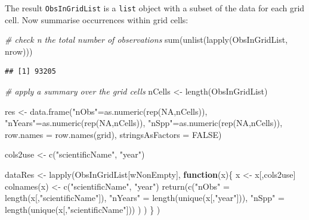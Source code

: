 \documentclass[
  10pt,
]{article}
\newenvironment{Shaded}{\begin{snugshade}}{\end{snugshade}}
\newcommand{\AttributeTok}[1]{\textcolor[rgb]{0.77,0.63,0.00}{#1}}
\newcommand{\CommentTok}[1]{\textcolor[rgb]{0.56,0.35,0.01}{\textit{#1}}}
\newcommand{\ConstantTok}[1]{\textcolor[rgb]{0.00,0.00,0.00}{#1}}
\newcommand{\ControlFlowTok}[1]{\textcolor[rgb]{0.13,0.29,0.53}{\textbf{#1}}}
\newcommand{\FunctionTok}[1]{\textcolor[rgb]{0.00,0.00,0.00}{#1}}
\newcommand{\NormalTok}[1]{#1}
\newcommand{\OtherTok}[1]{\textcolor[rgb]{0.56,0.35,0.01}{#1}}
\newcommand{\StringTok}[1]{\textcolor[rgb]{0.31,0.60,0.02}{#1}}
\begin{document}
The result \texttt{ObsInGridList} is a \texttt{list} object with a subset of the data for each grid cell. Now summarise occurrences within grid cells:

\begin{Shaded}
\begin{Highlighting}[]
\CommentTok{\# check n the total number of observations}
\FunctionTok{sum}\NormalTok{(}\FunctionTok{unlist}\NormalTok{(}\FunctionTok{lapply}\NormalTok{(ObsInGridList, nrow)))}
\end{Highlighting}
\end{Shaded}

\begin{verbatim}
## [1] 93205
\end{verbatim}

\begin{Shaded}
\begin{Highlighting}[]
\CommentTok{\# apply a summary over the grid cells }
\NormalTok{nCells }\OtherTok{\textless{}{-}} \FunctionTok{length}\NormalTok{(ObsInGridList)}

\NormalTok{res }\OtherTok{\textless{}{-}} \FunctionTok{data.frame}\NormalTok{(}\StringTok{"nObs"}\OtherTok{=}\FunctionTok{as.numeric}\NormalTok{(}\FunctionTok{rep}\NormalTok{(}\ConstantTok{NA}\NormalTok{,nCells)),}
                  \StringTok{"nYears"}\OtherTok{=}\FunctionTok{as.numeric}\NormalTok{(}\FunctionTok{rep}\NormalTok{(}\ConstantTok{NA}\NormalTok{,nCells)),}
                  \StringTok{"nSpp"}\OtherTok{=}\FunctionTok{as.numeric}\NormalTok{(}\FunctionTok{rep}\NormalTok{(}\ConstantTok{NA}\NormalTok{,nCells)),}
                  \AttributeTok{row.names =} \FunctionTok{row.names}\NormalTok{(grid),}
                  \AttributeTok{stringsAsFactors =} \ConstantTok{FALSE}\NormalTok{)}

\NormalTok{cols2use }\OtherTok{\textless{}{-}} \FunctionTok{c}\NormalTok{(}\StringTok{"scientificName"}\NormalTok{, }\StringTok{"year"}\NormalTok{)}

\NormalTok{dataRes }\OtherTok{\textless{}{-}} \FunctionTok{lapply}\NormalTok{(ObsInGridList[wNonEmpty], }
                  \ControlFlowTok{function}\NormalTok{(x)\{}
\NormalTok{                    x }\OtherTok{\textless{}{-}}\NormalTok{ x[,cols2use]}
                    \FunctionTok{colnames}\NormalTok{(x) }\OtherTok{\textless{}{-}} \FunctionTok{c}\NormalTok{(}\StringTok{"scientificName"}\NormalTok{, }\StringTok{"year"}\NormalTok{)}
                    \FunctionTok{return}\NormalTok{(}\FunctionTok{c}\NormalTok{(}\StringTok{"nObs"} \OtherTok{=} \FunctionTok{length}\NormalTok{(x[,}\StringTok{"scientificName"}\NormalTok{]),}
                             \StringTok{"nYears"} \OtherTok{=} \FunctionTok{length}\NormalTok{(}\FunctionTok{unique}\NormalTok{(x[,}\StringTok{"year"}\NormalTok{])),}
                             \StringTok{"nSpp"} \OtherTok{=} \FunctionTok{length}\NormalTok{(}\FunctionTok{unique}\NormalTok{(x[,}\StringTok{"scientificName"}\NormalTok{]))}
\NormalTok{                             )}
\NormalTok{                           )}
\NormalTok{                    \}}
\NormalTok{                  )}


\end{Highlighting}
\end{Shaded}
\end{document}
